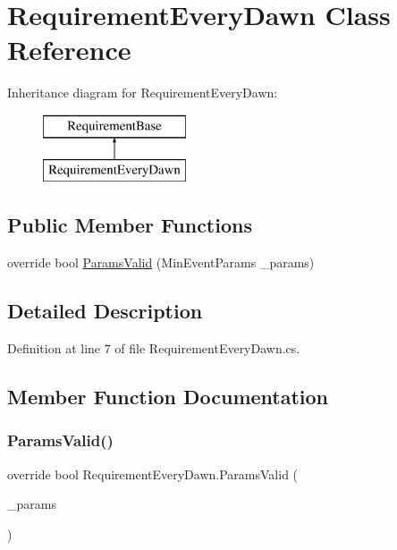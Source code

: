 \hypertarget{class_requirement_every_dawn}{}\section{Requirement\+Every\+Dawn Class Reference}
\label{class_requirement_every_dawn}
Inheritance diagram for Requirement\+Every\+Dawn\+:\begin{figure}[H]
\begin{center}
\leavevmode
\includegraphics[height=2.000000cm]{df/d2c/class_requirement_every_dawn}
\end{center}
\end{figure}
\subsection*{Public Member Functions}
\begin{DoxyCompactItemize}
\item 
override bool \mbox{\hyperlink{class_requirement_every_dawn_ac497f086fcc85d450bf5c8d02b511eb3}{Params\+Valid}} (Min\+Event\+Params \+\_\+params)
\end{DoxyCompactItemize}


\subsection{Detailed Description}


Definition at line 7 of file Requirement\+Every\+Dawn.\+cs.



\subsection{Member Function Documentation}
\mbox{\label{class_requirement_every_dawn_ac497f086fcc85d450bf5c8d02b511eb3}} 
\subsubsection{\texorpdfstring{ParamsValid()}{ParamsValid()}}
{\footnotesize\ttfamily override bool Requirement\+Every\+Dawn.\+Params\+Valid (\begin{DoxyParamCaption}\item[{Min\+Event\+Params}]{\+\_\+params }\end{DoxyParamCaption})}



